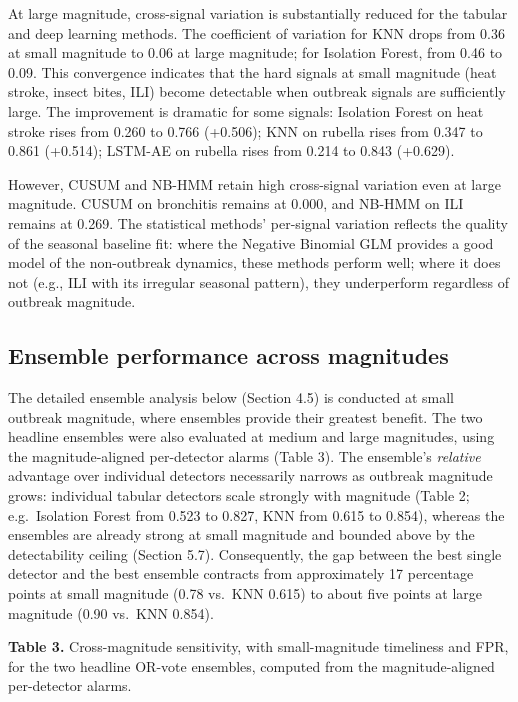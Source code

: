 \documentclass[11pt]{article}
\newcommand{\tabcap}[2]{\noindent\textbf{#1} #2\par\smallskip}
\begin{document}
At large magnitude, cross-signal variation is substantially reduced for the tabular and deep learning methods. The coefficient of variation for KNN drops from 0.36 at small magnitude to 0.06 at large magnitude; for Isolation Forest, from 0.46 to 0.09. This convergence indicates that the hard signals at small magnitude (heat stroke, insect bites, ILI) become detectable when outbreak signals are sufficiently large. The improvement is dramatic for some signals: Isolation Forest on heat stroke rises from 0.260 to 0.766 (+0.506); KNN on rubella rises from 0.347 to 0.861 (+0.514); LSTM-AE on rubella rises from 0.214 to 0.843 (+0.629).

However, CUSUM and NB-HMM retain high cross-signal variation even at large magnitude. CUSUM on bronchitis remains at 0.000, and NB-HMM on ILI remains at 0.269. The statistical methods' per-signal variation reflects the quality of the seasonal baseline fit: where the Negative Binomial GLM provides a good model of the non-outbreak dynamics, these methods perform well; where it does not (e.g., ILI with its irregular seasonal pattern), they underperform regardless of outbreak magnitude.

\subsection{Ensemble performance across magnitudes}

The detailed ensemble analysis below (Section 4.5) is conducted at small outbreak magnitude, where ensembles provide their greatest benefit. The two headline ensembles were also evaluated at medium and large magnitudes, using the magnitude-aligned per-detector alarms (Table 3). The ensemble's \textit{relative} advantage over individual detectors necessarily narrows as outbreak magnitude grows: individual tabular detectors scale strongly with magnitude (Table 2; e.g.\ Isolation Forest from 0.523 to 0.827, KNN from 0.615 to 0.854), whereas the ensembles are already strong at small magnitude and bounded above by the detectability ceiling (Section 5.7). Consequently, the gap between the best single detector and the best ensemble contracts from approximately 17 percentage points at small magnitude (0.78 vs.\ KNN 0.615) to about five points at large magnitude (0.90 vs.\ KNN 0.854).

\tabcap{Table 3.}{Cross-magnitude sensitivity, with small-magnitude timeliness and FPR, for the two headline OR-vote ensembles, computed from the magnitude-aligned per-detector alarms.}
\end{document}
